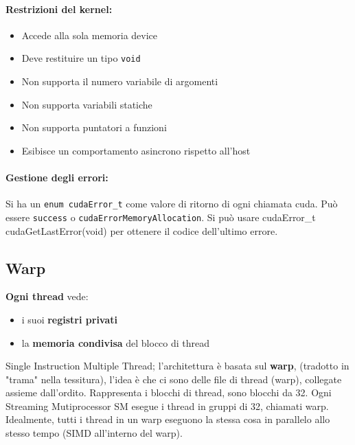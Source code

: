 \paragraph{Restrizioni del kernel: }
\begin{itemize}
	\item Accede alla sola memoria device
	\item Deve restituire un tipo \texttt{void}
	\item Non supporta il numero variabile di argomenti
	\item Non supporta variabili statiche
	\item Non supporta puntatori a funzioni
	\item Esibisce un comportamento asincrono rispetto all'host
\end{itemize}

\paragraph{Gestione degli errori:} Si ha un \texttt{enum cudaError\_t} come valore di ritorno di ogni chiamata cuda. Può essere \texttt{success} o \texttt{cudaErrorMemoryAllocation}. Si può usare {cudaError\_t cudaGetLastError(void)} per ottenere il codice dell'ultimo errore.\\




\newpage

\subsection{Warp}

\textbf{Ogni thread} vede: 
\begin{itemize}
	\item i suoi \textbf{registri privati}
	\item la \textbf{memoria condivisa} del blocco di thread
\end{itemize}

Single Instruction Multiple Thread; l'architettura è basata sul \textbf{warp}, (tradotto in "trama" nella tessitura), l'idea è che ci sono delle file di thread (warp), collegate assieme dall'ordito. Rappresenta i blocchi di thread, sono blocchi da 32. Ogni Streaming Mutiprocessor SM esegue i thread in gruppi di 32, chiamati warp. Idealmente, tutti i thread in un warp eseguono la stessa cosa in parallelo allo stesso tempo (SIMD all'interno del warp).\\

